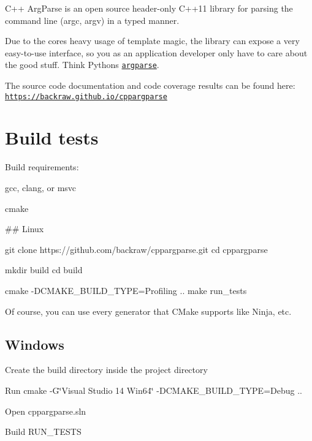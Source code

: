C++ Arg\+Parse is an open source header-\/only C++11 library for parsing the command line ({\ttfamily argc}, {\ttfamily argv}) in a typed manner.

Due to the core\textquotesingle{}s heavy usage of template magic, the library can expose a very easy-\/to-\/use interface, so you as an application developer only have to care about the good stuff. Think Python\textquotesingle{}s \href{https://docs.python.org/3/library/argparse.html}{\tt argparse}.

\href{https://travis-ci.org/backraw/cppargparse}{\tt }

The source code documentation and code coverage results can be found here\+: \href{https://backraw.github.io/cppargparse}{\tt https\+://backraw.\+github.\+io/cppargparse}

\section*{Build tests}

Build requirements\+:
\begin{DoxyItemize}
\item {\ttfamily gcc}, {\ttfamily clang}, or {\ttfamily msvc}
\item {\ttfamily cmake}
\end{DoxyItemize}

\#\# Linux 
\begin{DoxyCode}
git clone https://github.com/backraw/cppargparse.git
cd cppargparse

mkdir build
cd build

cmake -DCMAKE\_BUILD\_TYPE=Profiling ..
make run\_tests
\end{DoxyCode}


Of course, you can use every generator that C\+Make supports like Ninja, etc.

\subsection*{Windows}


\begin{DoxyItemize}
\item Create the {\ttfamily build} directory inside the project directory
\item Run {\ttfamily cmake -\/G\char`\"{}\+Visual Studio 14 Win64\char`\"{} -\/\+D\+C\+M\+A\+K\+E\+\_\+\+B\+U\+I\+L\+D\+\_\+\+T\+Y\+PE=Debug ..}
\item Open {\ttfamily cppargparse.\+sln}
\item Build {\ttfamily R\+U\+N\+\_\+\+T\+E\+S\+TS}
\end{DoxyItemize}

